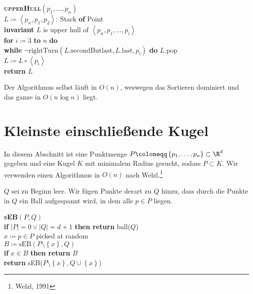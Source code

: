 \begin{pseudocode}
  \textbf{\textsc{upperHull}}\( (p_1,\dots,p_n) \) \\
  \( L \coloneqq \left\langle p_n,p_1,p_2 \right\rangle \): Stack \textbf{of} Point \\
  \textbf{invariant} \( L \) is upper hull of \( \left\langle p_n,p_1,\dots,p_i \right\rangle \) \\
  \textbf{for} \( i \coloneqq 3 \) \textbf{to} \( n \) \textbf{do} \\
  \phantom{\enskip} \textbf{while} \( \neg \text{rightTurn}(L\text{.secondButlast},  L\text{.last}, p_i) \) \textbf{do} \( L\text{.pop} \) \\
  \phantom{\enskip} \( L \coloneqq L \circ \left\langle p_i \right\rangle \) \\
  \textbf{return} \( L \)
\end{pseudocode}

Der Algorithmus selbst läuft in \( O(n) \), weswegen das Sortieren dominiert und das ganze in \( O(n\log n) \) liegt.

\section{Kleinste einschließende Kugel}

In diesem Abschnitt ist eine Punktmenge \( P \coloneqq \left \{ p_1, \dots, p_n \right \} \subset \R^d \) gegeben und eine Kugel \( K \) mit minimalem Radius gesucht, sodass \( P \subset K \). Wir verwenden einen Algorithmus in \( O(n) \) nach Welzl.\footnote{Welzl, 1991}

\( Q \) sei zu Beginn leer. Wir fügen Punkte derart zu \( Q \) hinzu, dass durch die Punkte in \( Q \) ein Ball aufgespannt wird, in dem alle \( p \in P \) liegen.

\begin{pseudocode}
  \textbf{\textsc{sEB}}\( (P,Q) \) \\
  \textbf{if} \( \left\vert P \right\vert = 0 \vee \left\vert Q \right\vert = d + 1 \) \textbf{then return} ball(\( Q \)) \\
  \( x \coloneqq p \in P \) picked at random \\
  \( B \coloneqq \text{sEB}(P \setminus \left \{ x \right \}, Q) \) \\
  \textbf{if} \( x \in B \) \textbf{then return} \( B \) \\
  \textbf{return} sEB(\( P \setminus \left \{ x \right \}, Q \cup \left \{ x \right \} \))
\end{pseudocode}

